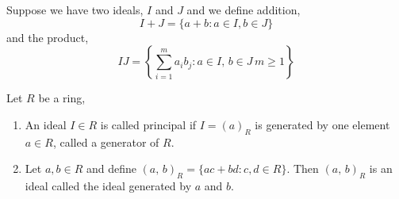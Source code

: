 \documentclass{article}
\begin{document}
\begin{ndefi}
  Suppose we have two ideals, $I$ and $J$ and we define addition,
  $$ I + J = \{ a + b : a \in I, b \in J\} $$
  and the product,
  $$ IJ = \left\{\sum_{i=1}^m a_ib_j : a \in I,\,b\in J\, m \ge 1 \right\} $$
\end{ndefi}

\begin{ndefi}
  Let $R$ be a ring,
  \begin{enumerate}
    \item An ideal $I \in R$ is called principal if $I = (a)_R$ is generated by one element $a \in R$, called a generator of $R$.
    \item Let $a, b \in R$ and define $(a,\,b)_R = \{ac + bd : c, d \in R\}$. Then $(a,\,b)_R$ is an ideal called the ideal generated by $a$ and $b$.
  \end{enumerate}
\end{ndefi}
\end{document}
